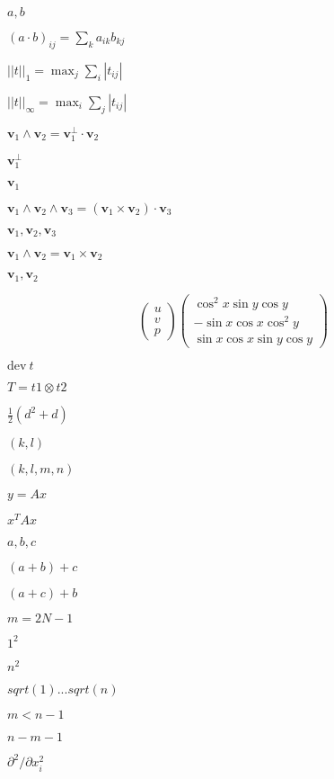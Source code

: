 \documentclass{article}
\begin{document}
$a,b$
\pagebreak

$(a\cdot b)_{ij}=\sum_k a_{ik}b_{kj}$
\pagebreak

$||t||_1 = \max_j \sum_i |t_{ij}|$
\pagebreak

$||t||_\infty = \max_i \sum_j |t_{ij}|$
\pagebreak

$\mathbf v_1\wedge \mathbf v_2=\mathbf v_1^\perp \cdot\mathbf v_2$
\pagebreak

$\mathbf v_1^\perp$
\pagebreak

$\mathbf v_1$
\pagebreak

$\mathbf v_1\wedge \mathbf v_2 \wedge \mathbf v_3 = (\mathbf v_1\times \mathbf v_2)\cdot \mathbf v_3$
\pagebreak

$\mathbf v_1, \mathbf v_2, \mathbf v_3$
\pagebreak

$\mathbf v_1 \wedge \mathbf v_2=\mathbf v_1 \times \mathbf v_2$
\pagebreak

$\mathbf v_1,\mathbf v_2$
\pagebreak

\[ \left(\begin{array}{c}u\\v\\p\end{array}\right) \left(\begin{array}{c}\cos^2x \sin y\cos y\\-\sin x\cos x\cos^2y\\ \sin x\cos x\sin y\cos y\end{array}\right) \]
\pagebreak

$\textrm{dev}\ t$
\pagebreak

$T=t1 \otimes t2$
\pagebreak

$\frac 12 (d^2+d)$
\pagebreak

$(k,l)$
\pagebreak

$(k,l,m,n)$
\pagebreak

$y=Ax$
\pagebreak

$x^T A x$
\pagebreak

$a,b,c$
\pagebreak

$(a+b)+c$
\pagebreak

$(a+c)+b$
\pagebreak

$m = 2N-1$
\pagebreak

$1^2$
\pagebreak

$n^2$
\pagebreak

$sqrt(1)...sqrt(n)$
\pagebreak

$m < n-1$
\pagebreak

$n-m-1$
\pagebreak

$\partial^2/\partial x_i^2$
\pagebreak
\end{document}

